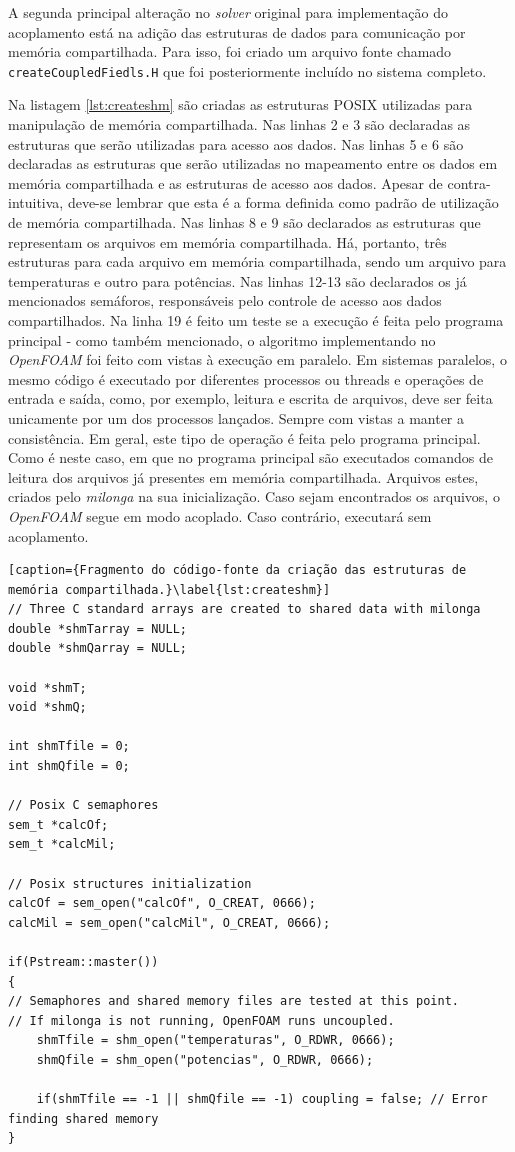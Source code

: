 A segunda principal alteração no \textit{solver} original para implementação do acoplamento
está na adição das estruturas de dados para comunicação por memória compartilhada. Para isso,
foi criado um arquivo fonte chamado \texttt{createCoupledFiedls.H} que foi posteriormente
incluído no sistema completo.

Na listagem \ref{lst:createshm} são criadas as estruturas POSIX utilizadas para manipulação
de memória compartilhada. Nas linhas 2 e 3 são declaradas as estruturas que serão utilizadas para
acesso aos dados. Nas linhas 5 e 6 são declaradas as estruturas que serão utilizadas no mapeamento
entre os dados em memória compartilhada e as estruturas de acesso aos dados. Apesar de contra-intuitiva,
deve-se lembrar que esta é a forma definida como padrão de utilização de memória compartilhada. Nas linhas
8 e 9 são declarados as estruturas que representam os arquivos em memória compartilhada. Há, portanto, três
estruturas para cada arquivo em memória compartilhada, sendo um arquivo para temperaturas e outro para potências.
Nas linhas 12-13 são declarados os já mencionados semáforos, responsáveis pelo controle de acesso aos
dados compartilhados. Na linha 19 é feito um teste se a execução é feita pelo programa principal - como também
mencionado, o algoritmo implementando no \textit{OpenFOAM} foi feito com vistas à execução em paralelo.
Em sistemas paralelos, o mesmo código é executado por diferentes processos ou threads e operações
de entrada e saída, como, por exemplo, leitura e escrita de arquivos, deve ser feita unicamente por um
dos processos lançados. Sempre com vistas a manter a consistência. Em geral, este tipo de operação
é feita pelo programa principal. Como é neste caso, em que no programa principal são executados
comandos de leitura dos arquivos já presentes em memória
compartilhada. Arquivos estes, criados pelo \textit{milonga} na sua inicialização. Caso sejam encontrados
os arquivos, o \textit{OpenFOAM} segue em modo acoplado. Caso contrário, executará sem acoplamento.


\begin{lstlisting}[caption={Fragmento do código-fonte da criação das estruturas de memória compartilhada.}\label{lst:createshm}]
// Three C standard arrays are created to shared data with milonga
double *shmTarray = NULL;
double *shmQarray = NULL;

void *shmT;
void *shmQ;

int shmTfile = 0;
int shmQfile = 0;

// Posix C semaphores
sem_t *calcOf;
sem_t *calcMil;

// Posix structures initialization
calcOf = sem_open("calcOf", O_CREAT, 0666);
calcMil = sem_open("calcMil", O_CREAT, 0666);

if(Pstream::master())
{
// Semaphores and shared memory files are tested at this point.
// If milonga is not running, OpenFOAM runs uncoupled.
    shmTfile = shm_open("temperaturas", O_RDWR, 0666);
    shmQfile = shm_open("potencias", O_RDWR, 0666);
    
    if(shmTfile == -1 || shmQfile == -1) coupling = false; // Error finding shared memory
}
\end{lstlisting}

